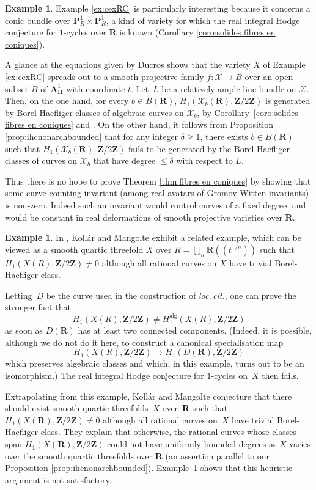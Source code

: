 \documentclass[JEP,XML,SOM,Unicode]{cedram}
\newcommand{\lpr}{(\!(}
\newcommand{\rpr}{)\!)}
\theoremstyle{plain}
\theoremstyle{definition}
\newtheorem{example}[thm]{Example}
\numberwithin{equation}{section}
\newcommand{\alg}{{\mathrm{alg}}}
\newcommand{\sX}{{\mathscr X}}
\newcommand{\A}{{\mathbf A}}
\renewcommand{\P}{{\mathbf P}}
\newcommand{\R}{{\mathbf R}}
\newcommand{\Z}{{\mathbf Z}}
\begin{document}
\begin{example}
\label{ex:implicationsDucros}
Example \ref{ex:cexRC} is particularly interesting because it concerns a conic bundle over $\P^1_R\times\P^1_R$, a kind of variety for which the real integral Hodge conjecture for $1$-cycles over $\R$ is known (Corollary \ref{coro:solides fibres en coniques}).

A glance at the equations given by Ducros \cite[Prop.\,8.11]{ducros}
shows that the variety $X$ of Example \ref{ex:cexRC} spreads out to a smooth projective family $f:\sX\to B$ over an open subset $B$ of $\A^1_{\R}$ with coordinate $t$.
Let~$L$ be a relatively ample line bundle on $\sX$.
Then, on the one hand, for every $b\in B(\R)$, $H_1(\sX_b(\R),\Z/2\Z)$ is generated by Borel-Haefliger classes of algebraic curves on $\sX_b$,
by
Corollary~\ref{coro:solides fibres en coniques}
and \cite[Cor.\,\ref*{BW1-cor:IHC pour solides RC ou CY}]{BW1}.
On the other hand, it follows from Proposition \ref{prop:ihcnonarchbounded}
that for any integer $\delta\geq 1$, there exists $b\in B(\R)$ such that $H_1(\sX_b(\R),\Z/2\Z)$ fails to be generated by the Borel-Haefliger classes of curves on $\sX_b$ that have degree $\leq \delta$ with respect to $L$.

Thus there is no hope to prove Theorem \ref{thm:fibres en coniques}
by showing that some curve-counting invariant (among real avatars of Gromov-Witten invariants) is non-zero. Indeed such an invariant would control curves of a fixed degree, and would be constant in real deformations of smooth projective varieties over $\R$.
\end{example}

\begin{example}
In \cite[Example 26.2]{kollarmangolte}, Koll\'ar and Mangolte exhibit a related example,
which can be viewed as
a smooth quartic threefold $X$ over $R=\bigcup_n\R\lpr t^{1/n}\rpr$ such that $H_1(X(R),\Z/2\Z)\neq 0$ although all rational curves on $X$ have trivial Borel-Haefliger class.

Letting~$D$ be the curve used in the construction of \emph{loc.\,cit.},
one can prove the stronger fact that
\[
H_1(X(R),\Z/2\Z)\neq H_1^{\alg}(X(R),\Z/2\Z)
\]
as soon as $D(\R)$ has at least two connected components.
(Indeed, it is possible, although we do not do it here, to construct a canonical specialisation map
\[
H_1(X(R),\Z/2\Z)\to H_1(D(\R),\Z/2\Z)
\]
which preserves algebraic classes and which, in this example, turns out
to be an isomorphism.)
The real integral Hodge conjecture for $1$\nobreakdash-cycles on~$X$ then fails.

Extrapolating from this example, Koll\'ar and Mangolte conjecture that there should exist smooth quartic threefolds~$X$
over~$\R$
such that $H_1(X(\R),\Z/2\Z)\neq 0$ although all rational curves on~$X$ have trivial Borel-Haefliger class.
They explain that otherwise, the rational curves whose classes span $H_1(X(\R),\Z/2\Z)$ could not have uniformly bounded degrees as $X$ varies over the smooth quartic threefolds over $\R$ (an assertion parallel to our Proposition \ref{prop:ihcnonarchbounded}). Example~\ref{ex:implicationsDucros} shows that this heuristic argument is not satisfactory.
\end{example}
\end{document}
